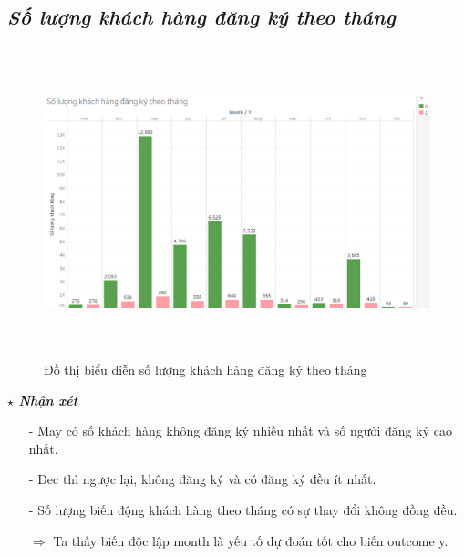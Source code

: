 \documentclass{report}
\begin{document}
\subsection{\textit{Số lượng khách hàng đăng ký theo tháng}}
         \begin{center}
        \begin{figure}[htp]
    	\begin{center}
    		\includegraphics[width=15cm, height=9cm]{images/hinh6.png}
    	\end{center}
    		\caption{Đồ thị biểu diễn số lượng khách hàng đăng ký theo tháng}
    \end{figure}
    \end{center}
    \fontsize{13}{14}\selectfont \textbf{$\star$\textit{ Nhận xét}}
    \begin{enumerate}
        \item[- ] May có số khách hàng không đăng ký nhiều nhất và số người đăng ký cao nhất.
        \item[- ] Dec thì ngược lại, không đăng ký và có đăng ký đều ít nhất.
        \item[- ] Số lượng biến động khách hàng theo tháng có sự thay đổi không đồng đều.
        \item [$\Rightarrow$] Ta thấy biến độc lập month là yếu tố dự đoán tốt cho biến outcome y.
    \end{enumerate}
\pagebreak
\end{document}

